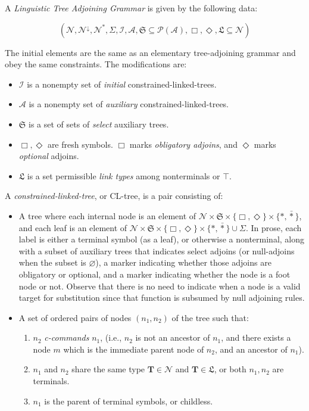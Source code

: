 \begin{defn}

A \emph{Linguistic Tree Adjoining Grammar} is given by the following data:

\[(\mathcal{N}, \mathcal{N}^\downarrow, \mathcal{N}^*, \Sigma, \mathcal{I}, \mathcal{A}, \mathfrak{S} \subseteq \mathcal{P}(\mathcal{A}), \Box, \Diamond, \mathfrak{L} \subseteq \mathcal{N})\]

The initial elements are the same as an elementary tree-adjoining grammar and obey the same constraints. The modifications are:

\begin{itemize}
\item{$\mathcal{I}$ is a nonempty set of \emph{initial} constrained-linked-trees.}
\item{$\mathcal{A}$ is a nonempty set of \emph{auxiliary} constrained-linked-trees.}
\item{$\mathfrak{S}$ is a set of sets of \emph{select} auxiliary trees.}
\item{$\Box, \Diamond$ are fresh symbols. $\Box$ marks \emph{obligatory adjoins}, and $\Diamond$ marks \emph{optional} adjoins.}
\item{$\mathfrak{L}$ is a set permissible \emph{link types} among nonterminals or $\top$.}
\end{itemize}
A \emph{constrained-linked-tree}, or CL-tree, is a pair consisting of:
\begin{itemize}
\item{A tree where each internal node is an element of $\mathcal{N} \times \mathfrak{S} \times \{\Box,\Diamond\} \times \{*, \bar{*}\}$, and each leaf is an element of $\mathcal{N} \times \mathfrak{S} \times \{\Box,\Diamond\} \times \{*, \bar{*}\} \cup \Sigma$. In prose, each label is either a terminal symbol (as a leaf), or otherwise a nonterminal, along with a subset of auxiliary trees that indicates select adjoins (or null-adjoins when the subset is $\varnothing$), a marker indicating whether those adjoins are obligatory or optional, and a marker indicating whether the node is a foot node or not. Observe that there is no need to indicate when a node is a valid target for substitution since that function is subsumed by null adjoining rules.}
\item{
A set of ordered pairs of nodes $(n_1,n_2)$ of the tree such that:
\begin{enumerate}
\item{$n_2$ \emph{c-commands} $n_1$, (i.e., $n_2$ is not an ancestor of $n_1$, and there exists a node $m$ which is the immediate parent node of $n_2$, and an ancestor of $n_1$).}
\item{$n_1$ and $n_2$ share the same type $\mathbf{T} \in \mathcal{N}$ and $\mathbf{T} \in \mathfrak{L}$, or both $n_1,n_2$ are terminals.}
\item{$n_1$ is the parent of terminal symbols, or childless.}
\end{enumerate}
}
\end{itemize}


\end{defn}
